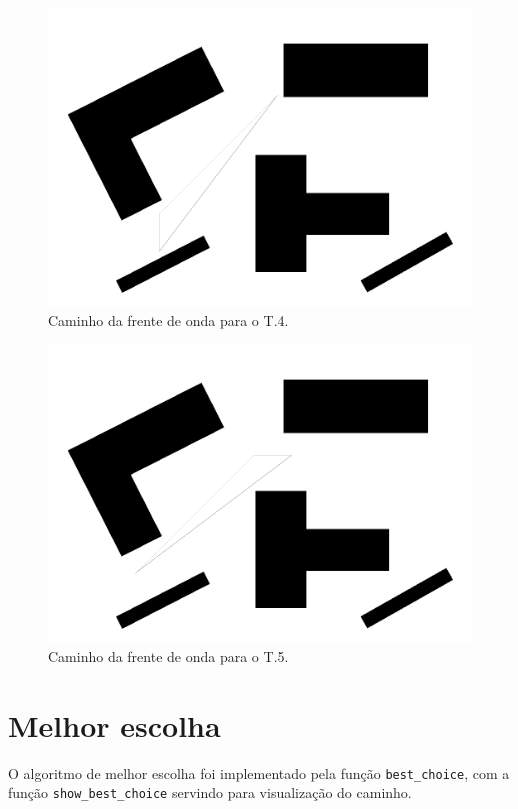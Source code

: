 \documentclass[12pt]{article}
\theoremstyle{plain}
\numberwithin{equation}{section}
\newcommand{\code}[1]{\lstinline[mathescape=true]{#1}}
\begin{document}
\begin{figure}[H]
  \centering\includegraphics[scale=0.4]{imgs/wavefront_path_4.png}
  \caption{Caminho da frente de onda para o T.4.}
\end{figure}

\begin{figure}[H]
  \centering\includegraphics[scale=0.4]{imgs/wavefront_path_5.png}
  \caption{Caminho da frente de onda para o T.5.}
\end{figure}

\section{Melhor escolha}

O algoritmo de melhor escolha foi implementado pela função \code{best_choice}, com a função
\code{show_best_choice} servindo para visualização do caminho.
\end{document}
